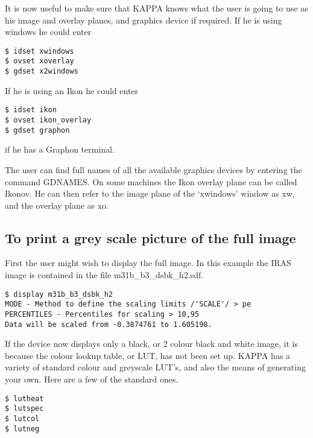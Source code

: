 It is now useful to make sure that KAPPA knows what the user is going to use as 
his image and overlay planes, and graphics device if required. If he is using
windows he could enter
\begin{small}
\begin{verbatim}
$ idset xwindows
$ ovset xoverlay
$ gdset x2windows
\end{verbatim}
\end{small}

If he is using an Ikon he could enter
\begin{small}
\begin{verbatim}
$ idset ikon
$ ovset ikon_overlay
$ gdset graphon
\end{verbatim}
\end{small}
if he has a Graphon terminal.

The user can find full names of all the available graphics devices by entering
the command GDNAMES. On some machines the Ikon overlay plane can be called
Ikonov. He can then refer to the image plane of the `xwindows' window  as xw,
and the overlay plane as xo. 

\subsection{To print a grey scale picture of the full image}
\label{k:fullim}
First the user might wish to display the full image. In this example the IRAS
image is contained in the file m31b\_b3\_dsbk\_h2.sdf.
\begin{small}
\begin{verbatim}
$ display m31b_b3_dsbk_h2 
MODE - Method to define the scaling limits /'SCALE'/ > pe
PERCENTILES - Percentiles for scaling > 10,95
Data will be scaled from -0.3874761 to 1.605198.
\end{verbatim}
\end{small}

If the device now displays only a black, or 2 colour black and white image, it
is because the colour lookup table, or LUT, has not been set up. KAPPA has
a variety of standard colour and greyscale LUT's, and also the means of 
generating your own. Here are a few of the standard ones.

\begin{small}
\begin{verbatim}
$ lutheat
$ lutspec
$ lutcol
$ lutneg
\end{verbatim}
\end{small}

